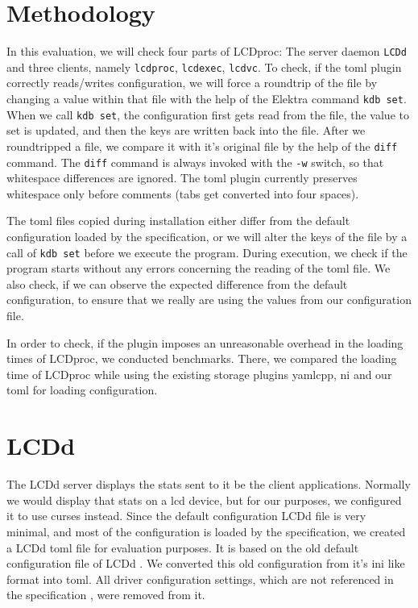 \documentclass[draft,final]{vutinfth} %
\begin{document}
\section{Methodology}
In this evaluation, we will check four parts of LCDproc: The server daemon \texttt{LCDd} and three clients, namely \texttt{lcdproc}, \texttt{lcdexec}, \texttt{lcdvc}.
To check, if the \acrshort{toml} plugin correctly reads/writes configuration, we will force a roundtrip of the file by changing a value within that file with the help of the Elektra command \texttt{kdb set}.
When we call \texttt{kdb set}, the configuration first gets read from the file, the value to set is updated, and then the keys are written back into the file.
After we roundtripped a file, we compare it with it's original file by the help of the \texttt{diff} command.
The \texttt{diff} command is always invoked with the \texttt{-w} switch, so that whitespace differences are ignored.
The \acrshort{toml} plugin currently preserves whitespace only before comments (tabs get converted into four spaces).

The \acrshort{toml} files copied during installation either differ from the default configuration loaded by the specification, or we will alter the keys of the file by a call of \texttt{kdb set} before we execute the program.
During execution, we check if the program starts without any errors concerning the reading of the \acrshort{toml} file.
We also check, if we can observe the expected difference from the default configuration, to ensure that we really are using the values from our configuration file.

In order to check, if the plugin imposes an unreasonable overhead in the loading times of LCDproc, we conducted benchmarks.
There, we compared the loading time of LCDproc while using the existing storage plugins yamlcpp, ni and our \acrshort{toml} for loading configuration.

\section{LCDd}
The LCDd server displays the stats sent to it be the client applications. Normally we would display that stats on a \acrshort{lcd} device, but for our purposes, we configured it to use curses instead.
Since the default configuration LCDd file is very minimal, and most of the configuration is loaded by the specification, we created a LCDd \acrshort{toml} file for evaluation purposes.
It is based on the old default configuration file of LCDd \cite{LCDprocconf}.
We converted this old configuration from it's ini like format into \acrshort{toml}.
All driver configuration settings, which are not referenced in the specification \cite{bauhausforklcdprocslcddspec}, were removed from it.
\end{document}
